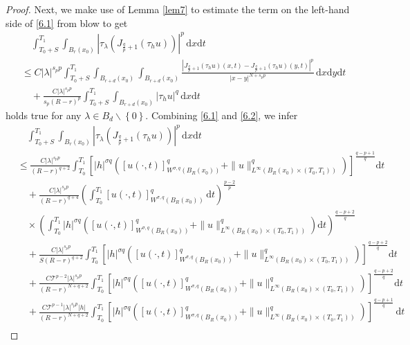 \documentclass[reqno,10pt]{amsart}
\numberwithin{equation}{section}
\begin{document}
\begin{proof}
	Next, we make use of Lemma \ref{lem7} to estimate the term on the left-hand side of \eqref{6.1} from blow to get
	\begin{align}
		\label{6.2}
		&\quad\int_{T_0+S}^{T_1}\int_{B_r(x_0)}\left|\tau_\lambda\left(J_{\frac{q}{p}+1}\left(\tau_hu\right) \right) \right|^p\,\mathrm{d}x\mathrm{d}t\nonumber\\
		&\le C|\lambda|^{s_pp}\int_{T_0+S}^{T_1}\int_{B_{r+d}(x_0)}\int_{B_{r+d}(x_0)}\frac{\left| J_{\frac{q}{p}+1}(\tau_hu)(x,t)-J_{\frac{q}{p}+1}(\tau_hu)(y,t)\right|^p}{|x-y|^{N+s_pp}}\,\mathrm{d}x\mathrm{d}y\mathrm{d}t\nonumber\\
		&\quad+\frac{C|\lambda|^{s_pp}}{s_p(R-r)^p}\int_{T_0+S}^{T_1}\int_{B_{r+d}(x_0)}|\tau_hu|^q\,\mathrm{d}x\mathrm{d}t
	\end{align}
	holds true for any $\lambda\in B_d\backslash\left\lbrace0\right\rbrace $. Combining \eqref{6.1} and \eqref{6.2}, we infer
	\begin{align}
		\label{6.3}
		&\quad\int_{T_0+S}^{T_1}\int_{B_r(x_0)}\left|\tau_\lambda\left(J_{\frac{q}{p}+1}\left(\tau_hu\right) \right) \right|^p\,\mathrm{d}x\mathrm{d}t\nonumber\\
		&\le \frac{C|\lambda|^{s_pp}}{(R-r)^{q+2}}\int_{T_0}^{T_1}\left[|h|^{\sigma q}\left([u(\cdot,t)]^q_{W^{\sigma,q}(B_R(x_0))}+\|u\|^q_{L^\infty\left( B_{R}(x_0)\times(T_0,T_1)\right) }\right)\right]^{\frac{q-p+1}{q}}\mathrm{d}t\nonumber\\
		&\quad+\frac{C|\lambda|^{s_pp}}{(R-r)^{q+4}}\left( \int_{T_0}^{T_1}[u(\cdot,t)]^{q}_{W^{\sigma,q}(B_R(x_0))}\,\mathrm{d}t\right)^\frac{p-2}{p}\nonumber\\
		&\quad\times\left(\int_{T_0}^{T_1}|h|^{\sigma q}\left([u(\cdot,t)]^q_{W^{\sigma,q}(B_R(x_0))}+\|u\|^q_{L^\infty\left( B_{R}(x_0)\times(T_0,T_1)\right) }\right)\mathrm{d}t\right)^{\frac{q-p+2}{q}}\nonumber\\
		&\quad+\frac{C|\lambda|^{s_pp}}{S(R-r)^{q+2}}\int_{T_0}^{T_1}\left[|h|^{\sigma q}\left([u(\cdot,t)]^q_{W^{\sigma,q}(B_R(x_0))}+\|u\|^q_{L^\infty\left( B_{R}(x_0)\times(T_0,T_1)\right) }\right)\right]^{\frac{q-p+2}{q}}\mathrm{d}t\nonumber\\
		&\quad+\frac{C\mathcal{T}^{p-2}|\lambda|^{s_pp}}{(R-r)^{N+q+2}}\int_{T_0}^{T_1}\left[|h|^{\sigma q}\left([u(\cdot,t)]^q_{W^{\sigma,q}(B_R(x_0))}+\|u\|^q_{L^\infty\left( B_{R}(x_0)\times(T_0,T_1)\right) }\right)\right]^{\frac{q-p+2}{q}}\mathrm{d}t\nonumber\\
		&\quad+\frac{C\mathcal{T}^{p-1}|\lambda|^{s_pp}|h|}{(R-r)^{N+q+2}}\int_{T_0}^{T_1}\left[|h|^{\sigma q}\left([u(\cdot,t)]^q_{W^{\sigma,q}(B_R(x_0))}+\|u\|^q_{L^\infty\left( B_{R}(x_0)\times(T_0,T_1)\right) }\right)\right]^{\frac{q-p+1}{q}}\,\mathrm{d}t\nonumber\\

\end{align}
\end{proof}
\end{document}
